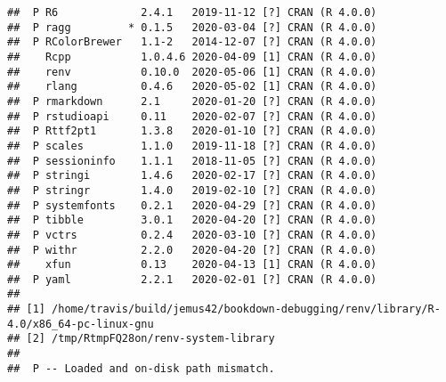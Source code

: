 \documentclass[ngerman,a4paper,]{scrartcl}
\begin{document}
\begin{verbatim}
##  P R6             2.4.1   2019-11-12 [?] CRAN (R 4.0.0)              
##  P ragg         * 0.1.5   2020-03-04 [?] CRAN (R 4.0.0)              
##  P RColorBrewer   1.1-2   2014-12-07 [?] CRAN (R 4.0.0)              
##    Rcpp           1.0.4.6 2020-04-09 [1] CRAN (R 4.0.0)              
##    renv           0.10.0  2020-05-06 [1] CRAN (R 4.0.0)              
##    rlang          0.4.6   2020-05-02 [1] CRAN (R 4.0.0)              
##  P rmarkdown      2.1     2020-01-20 [?] CRAN (R 4.0.0)              
##  P rstudioapi     0.11    2020-02-07 [?] CRAN (R 4.0.0)              
##  P Rttf2pt1       1.3.8   2020-01-10 [?] CRAN (R 4.0.0)              
##  P scales         1.1.0   2019-11-18 [?] CRAN (R 4.0.0)              
##  P sessioninfo    1.1.1   2018-11-05 [?] CRAN (R 4.0.0)              
##  P stringi        1.4.6   2020-02-17 [?] CRAN (R 4.0.0)              
##  P stringr        1.4.0   2019-02-10 [?] CRAN (R 4.0.0)              
##  P systemfonts    0.2.1   2020-04-29 [?] CRAN (R 4.0.0)              
##  P tibble         3.0.1   2020-04-20 [?] CRAN (R 4.0.0)              
##  P vctrs          0.2.4   2020-03-10 [?] CRAN (R 4.0.0)              
##  P withr          2.2.0   2020-04-20 [?] CRAN (R 4.0.0)              
##    xfun           0.13    2020-04-13 [1] CRAN (R 4.0.0)              
##  P yaml           2.2.1   2020-02-01 [?] CRAN (R 4.0.0)              
## 
## [1] /home/travis/build/jemus42/bookdown-debugging/renv/library/R-4.0/x86_64-pc-linux-gnu
## [2] /tmp/RtmpFQ28on/renv-system-library
## 
##  P -- Loaded and on-disk path mismatch.
\end{verbatim}


\end{document}
